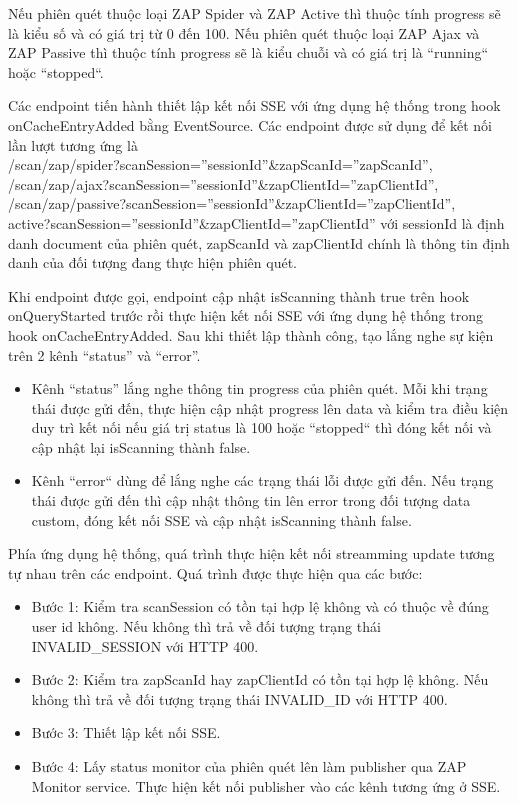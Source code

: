 Nếu phiên quét thuộc loại ZAP Spider và ZAP Active thì thuộc tính progress sẽ là kiểu số và có giá trị từ 0 đến 100.
Nếu phiên quét thuộc loại ZAP Ajax và ZAP Passive thì thuộc tính progress sẽ là kiểu chuỗi và có giá trị là “running“ hoặc “stopped“.

Các endpoint tiến hành thiết lập kết nối SSE với ứng dụng hệ thống trong hook onCacheEntryAdded bằng EventSource. Các endpoint được sử dụng để kết nối lần lượt tương ứng là \\
/scan/zap/spider?scanSession=”sessionId”\&zapScanId=”zapScanId”, \\
/scan/zap/ajax?scanSession=”sessionId”\&zapClientId=”zapClientId”, \\
/scan/zap/passive?scanSession=”sessionId”\&zapClientId=”zapClientId”, \\
active?scanSession=”sessionId”\&zapClientId=”zapClientId” với sessionId là định danh document của phiên quét, zapScanId và zapClientId chính là thông tin định danh của đối tượng đang thực hiện phiên quét.

Khi endpoint được gọi, endpoint cập nhật isScanning thành true trên hook onQueryStarted trước rồi thực hiện kết nối SSE với ứng dụng hệ thống trong hook onCacheEntryAdded.
Sau khi thiết lập thành công, tạo lắng nghe sự kiện trên 2 kênh “status” và “error”.
\begin{itemize}
  \item Kênh “status” lắng nghe thông tin progress của phiên quét.
        Mỗi khi trạng thái được gửi đến, thực hiện cập nhật progress lên data và kiểm tra điều kiện duy trì kết nối nếu giá trị status là 100 hoặc “stopped“ thì đóng kết nối và cập nhật lại isScanning thành false.
  \item Kênh “error“ dùng để lắng nghe các trạng thái lỗi được gửi đến.
        Nếu trạng thái được gửi đến thì cập nhật thông tin lên error trong đối tượng data custom, đóng kết nối SSE và cập nhật isScanning thành false.
\end{itemize}

Phía ứng dụng hệ thống, quá trình thực hiện kết nối streamming update tương tự nhau trên các endpoint. Quá trình được thực hiện qua các bước:

\begin{itemize}
  \item Bước 1: Kiểm tra scanSession có tồn tại hợp lệ không và có thuộc về đúng user id không. Nếu không thì trả về đối tượng trạng thái INVALID\_SESSION với HTTP 400.
  \item Bước 2: Kiểm tra zapScanId hay zapClientId có tồn tại hợp lệ không. Nếu không thì trả về đối tượng trạng thái INVALID\_ID với HTTP 400.
  \item Bước 3: Thiết lập kết nối SSE.
  \item Bước 4: Lấy status monitor của phiên quét lên làm publisher qua ZAP Monitor service. Thực hiện kết nối publisher vào các kênh tương ứng ở SSE.
\end{itemize}

